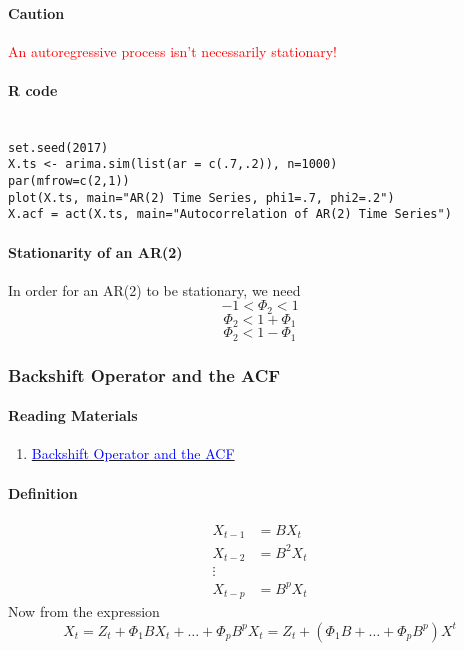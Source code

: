 \documentclass[11pt]{article}
\begin{document}
\paragraph{Caution}
\textcolor{red}{An autoregressive process isn't necessarily stationary!}
\paragraph{R code}
\begin{align*}
\end{align*}
\begin{lstlisting}
set.seed(2017) 
X.ts <- arima.sim(list(ar = c(.7,.2)), n=1000) 
par(mfrow=c(2,1)) 
plot(X.ts, main="AR(2) Time Series, phi1=.7, phi2=.2")
X.acf = act(X.ts, main="Autocorrelation of AR(2) Time Series")
\end{lstlisting}
\paragraph{Stationarity of an AR(2)}
In order for an AR(2) to be stationary, we need
$$-1 < \Phi_2 < 1$$
$$\Phi_2 < 1 + \Phi_1$$
$$\Phi_2 < 1 - \Phi_1$$


\subsubsection{Backshift Operator and the ACF}
\paragraph{Reading Materials}
\begin{enumerate}
	\item \href{https://d18ky98rnyall9.cloudfront.net/_d570e41d8783f122a8a58349f1b9ab7e_Autoregressive-Processes----Backshift-Operator-and-ACF.pdf?Expires=1563580800&Signature=hC7W21Zc8AKXejuNbKJlZh0MSvf3e57tgReUagbTdoHo-yd050pvevwuF2w5dYdlXkT5rV0SMxr9Fr0ISJAP4DK38gQPLPE71uYSk7c~~L-ss-jyIlYnhbzrFI6DStdsYk22Su2VRWVC6QdAwkf0XvyktF09XAecZnqpOkIhDlA_&Key-Pair-Id=APKAJLTNE6QMUY6HBC5A}{\textcolor{blue}{Backshift Operator and the ACF}}
\end{enumerate}
\paragraph{Definition}
\begin{align*}
	X_{t-1} &= BX_t \\
	X_{t-2} &= B^2X_t \\
	\vdots \\
	X_{t-p} &= B^p X_t 
\end{align*}
Now from the expression
$$X_t = Z_t + \Phi_1BX_t + \hdots + \Phi_pB^pX_t = Z_t + (\Phi_1B + \hdots + \Phi_pB^p)X^t$$
\end{document}
